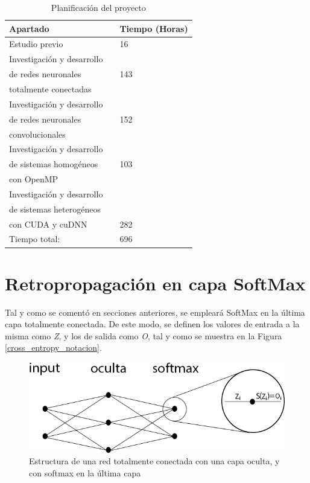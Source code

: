\begin{table}[H]
	\centering
	\begin{tabular}{|lll|}
		\hline
		Apartado 	 &\vline  & Tiempo (Horas) \\
		\hline
		
		Estudio previo    & \vline & 16 \\			
		\hline
		Investigación y desarrollo  	 & \vline & 	\\
		de redes neuronales  	 & \vline & 143	\\
		totalmente conectadas 	 & \vline & 	\\
		\hline
		Investigación y desarrollo    & \vline & 	 \\	
		de redes neuronales    & \vline & 152	 \\			
		convolucionales    & \vline & 	 \\					
		\hline
		Investigación y desarrollo  	 & \vline & 	 \\
		de sistemas homogéneos  	 & \vline & 103	 \\
		con OpenMP 	 & \vline & 	 \\
		\hline
		Investigación y desarrollo     & \vline &  	\\
		de sistemas heterogéneos    & \vline &  \\ 
		con CUDA y cuDNN    & \vline & 282 \\ 	
		\hline
		\hline
		Tiempo total:				& \vline & 696 \\
		\hline
	\end{tabular}
	\caption{Planificación del proyecto}
	\label{tabla_planificación}
\end{table}


\section{Retropropagación en capa SoftMax} 

Tal y como se comentó en secciones anteriores, se empleará SoftMax en la última capa totalmente conectada. De este modo, se definen los valores de entrada a la misma como \textit{Z}, y los de salida como \textit{O}, tal y como se muestra en la Figura \ref{cross_entropy_notacion}.

\begin{figure}[H]
	\centering
	\includegraphics[scale=0.4]{imagenes/NN_softmax.jpg}  
	\caption{Estructura de una red totalmente conectada con una capa oculta, y con softmax en la última capa}
	\label{fig:nn_softmax_1_capa}
\end{figure}

